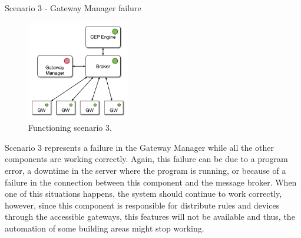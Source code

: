 \begin{Paragraph}{Scenario 3 - Gateway Manager failure}
	
	\begin{figure}[H]
		\centering
		\includegraphics[width=0.4\textwidth]{figures/fs5.png}
		\caption{Functioning scenario 3.}
		\label{fig:sc3}
	\end{figure}
	
	Scenario 3 represents a failure in the Gateway Manager while all the other components are working correctly. Again, this failure can be due to a program error, a downtime in the server where the program is running, or because of a failure in the connection between this component and the message broker. When one of this situations happens, the system should continue to work correctly, however, since this component is responsible for distribute rules and devices through the accessible gateways, this features will not be available and thus, the automation of some building areas might stop working.
	
	
\end{Paragraph}

